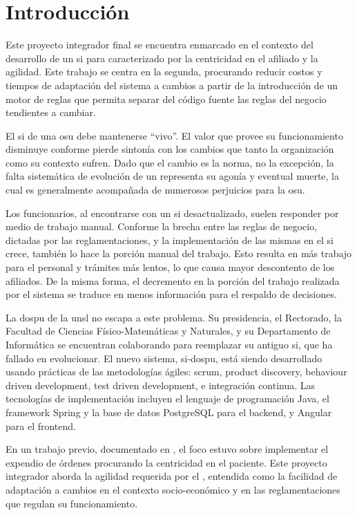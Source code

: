 \section{Introducción}\label{sec:intro}

Este proyecto integrador final se encuentra enmarcado en el contexto del desarrollo de un \acrfull{si} para  caracterizado por la centricidad en el afiliado y la agilidad. 
Este trabajo se centra en la segunda, procurando reducir costos y tiempos de adaptación del sistema a cambios a partir de la introducción de un motor de reglas que permita separar del código fuente las reglas del negocio tendientes a cambiar.

El \acrshort{si} de una \acrshort{osu} debe mantenerse ``vivo''. 
El valor que provee su funcionamiento disminuye conforme pierde sintonía con los cambios que tanto la organización 
como su contexto sufren. 
Dado que el cambio es la norma, no la excepción, la falta sistemática de evolución de un {\SIOSU} representa su agonía y eventual muerte, la cual es generalmente acompañada de numerosos perjuicios para la \acrshort{osu}.

Los funcionarios, al encontrarse con un \acrshort{si} desactualizado, suelen responder por medio de trabajo manual. Conforme la brecha entre las reglas de negocio, dictadas por las reglamentaciones, y la implementación de las mismas en el \acrshort{si} crece, también lo hace la porción manual del trabajo. Esto resulta en más trabajo para el personal y trámites más lentos, lo que causa mayor descontento de los afiliados. De la misma forma, el decremento en la porción del trabajo realizada por el sistema se traduce en menos información para el respaldo de decisiones.

La \acrfull{dospu} de la \acrfull{unsl} no escapa a este problema. 
Su presidencia, el Rectorado, la Facultad de Ciencias Físico-Matemáticas y Naturales, y su Departamento de Informática se encuentran colaborando para reemplazar su antiguo \acrshort{si}, que ha fallado en evolucionar. 
%
El nuevo sistema, \acrshort{si}-\acrshort{dospu}, está siendo desarrollado usando prácticas de las metodologías ágiles: scrum, product discovery, behaviour driven development, test driven development, e integración continua.
%
Las tecnologías de implementación incluyen el lenguaje de programación Java, el framework Spring \cite{springframework} y la base de datos PostgreSQL \cite{postgresql} para el backend, y Angular \cite{angular} para el frontend. 

En un trabajo previo, documentado en \cite{Vela2024}, el foco estuvo sobre implementar el expendio de órdenes procurando la centricidad en el paciente.
%
Este proyecto integrador aborda la agilidad requerida por el {\SIOSU}, entendida como la facilidad de adaptación a cambios en el contexto socio-económico y en las reglamentaciones que regulan su funcionamiento.

